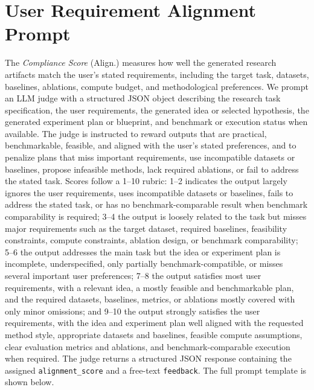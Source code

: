\documentclass{opendatalab}
\begin{document}
\section{User Requirement Alignment Prompt}
\label{app:alignment_prompt}

The \textit{Compliance Score} (Align.) measures how well the generated research artifacts match the user's stated requirements, including the target task, datasets, baselines, ablations, compute budget, and methodological preferences. We prompt an LLM judge with a structured JSON object describing the research task specification, the user requirements, the generated idea or selected hypothesis, the generated experiment plan or blueprint, and benchmark or execution status when available. The judge is instructed to reward outputs that are practical, benchmarkable, feasible, and aligned with the user's stated preferences, and to penalize plans that miss important requirements, use incompatible datasets or baselines, propose infeasible methods, lack required ablations, or fail to address the stated task. Scores follow a 1--10 rubric: 1--2 indicates the output largely ignores the user requirements, uses incompatible datasets or baselines, fails to address the stated task, or has no benchmark-comparable result when benchmark comparability is required; 3--4 the output is loosely related to the task but misses major requirements such as the target dataset, required baselines, feasibility constraints, compute constraints, ablation design, or benchmark comparability; 5--6 the output addresses the main task but the idea or experiment plan is incomplete, underspecified, only partially benchmark-compatible, or misses several important user preferences; 7--8 the output satisfies most user requirements, with a relevant idea, a mostly feasible and benchmarkable plan, and the required datasets, baselines, metrics, or ablations mostly covered with only minor omissions; and 9--10 the output strongly satisfies the user requirements, with the idea and experiment plan well aligned with the requested method style, appropriate datasets and baselines, feasible compute assumptions, clear evaluation metrics and ablations, and benchmark-comparable execution when required. The judge returns a structured JSON response containing the assigned \texttt{alignment\_score} and a free-text \texttt{feedback}. The full prompt template is shown below.
\end{document}
